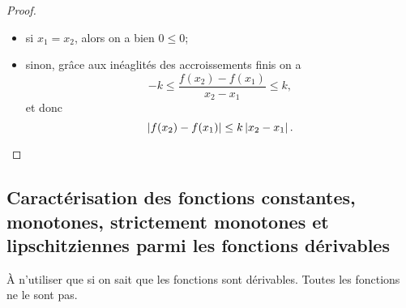 \begin{proof}
  \begin{itemize}
  \item si $x_1=x_2$, alors on a bien $0 \leq 0$;
  \item sinon, grâce aux inéaglités des accroissements finis on a
    \begin{equation}
      -k \leq \frac{f(x_2)-f(x_1)}{x_2-x_1} \leq k,
    \end{equation}
    et donc
    \begin{equation}
       \left\lvert f(x_2)-f(x_1)\right\rvert \leq k\left\lvert x_2-x_1\right\rvert.
    \end{equation}
  \end{itemize}
\end{proof}

\subsection{Caractérisation des fonctions constantes, monotones, strictement monotones et lipschitziennes parmi les fonctions dérivables}

À n'utiliser que si on sait que les fonctions sont dérivables. Toutes les fonctions ne le sont pas.

